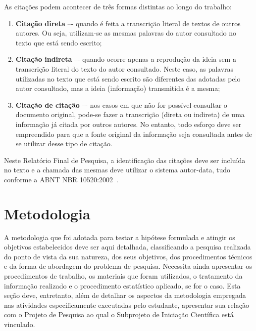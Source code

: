 \documentclass[10pt, a4paper]{article}
\begin{document}
As citações podem acontecer de três formas distintas ao longo do trabalho:
\begin{enumerate}[label=\alph*)]
\item \textbf{Citação direta} –- quando é feita a transcrição literal de textos de outros autores. Ou seja, utilizam-se as mesmas palavras do autor consultado no texto que está sendo escrito;

\item \textbf{Citação indireta} –- quando ocorre apenas a reprodução da ideia sem a transcrição literal do texto do autor consultado. Neste caso, as palavras utilizadas no texto que está sendo escrito são diferentes das adotadas pelo autor consultado, mas a ideia (informação) transmitida é a mesma;

\item \textbf{Citação de citação} –- nos casos em que não for possível consultar o documento original, pode-se fazer a transcrição (direta ou indireta) de uma informação já citada por outros autores. No entanto, todo esforço deve ser empreendido para que a fonte original da informação seja consultada antes de se utilizar desse tipo de citação.
\end{enumerate}

Neste Relatório Final de Pesquisa, a identificação das citações deve ser incluída no texto e a chamada das mesmas deve utilizar o sistema autor-data, tudo conforme a ABNT NBR 10520:2002~\citep{abnt:nbr10520}.




\section{Metodologia}
\label{sec-metodo}

A metodologia que foi adotada para testar a hipótese formulada e atingir os objetivos estabelecidos deve ser aqui detalhada, classificando a pesquisa realizada do ponto de vista da sua natureza, dos seus objetivos, dos procedimentos técnicos e da forma de abordagem do problema de pesquisa. Necessita ainda apresentar os procedimentos de trabalho, os materiais que foram utilizados, o tratamento da informação realizado e o procedimento estatístico aplicado, se for o caso. Esta seção deve, entretanto, além de detalhar os aspectos da metodologia empregada nas atividades especificamente executadas pelo estudante, apresentar sua relação com o Projeto de Pesquisa ao qual o Subprojeto de Iniciação Científica está vinculado.
\end{document}
